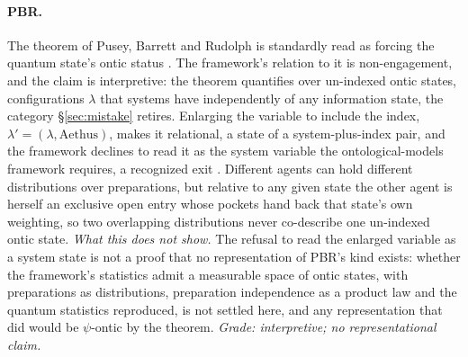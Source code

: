 \paragraph{PBR.} The theorem of Pusey, Barrett and Rudolph is standardly read as forcing the quantum state's ontic status \cite{pusey2012reality}. The framework's relation to it is non-engagement, and the claim is interpretive: the theorem quantifies over un-indexed ontic states, configurations $\lambda$ that systems have independently of any information state, the category \S\ref{sec:mistake} retires. Enlarging the variable to include the index, $\lambda' = (\lambda, \text{Aethus})$, makes it relational, a state of a system-plus-index pair, and the framework declines to read it as the system variable the ontological-models framework requires, a recognized exit \cite{leifer2014psi}. Different agents can hold different distributions over preparations, but relative to any given state the other agent is herself an exclusive open entry whose pockets hand back that state's own weighting, so two overlapping distributions never co-describe one un-indexed ontic state. \emph{What this does not show.} The refusal to read the enlarged variable as a system state is not a proof that no representation of PBR's kind exists: whether the framework's statistics admit a measurable space of ontic states, with preparations as distributions, preparation independence as a product law and the quantum statistics reproduced, is not settled here, and any representation that did would be $\psi$-ontic by the theorem. \emph{Grade: interpretive; no representational claim.}


